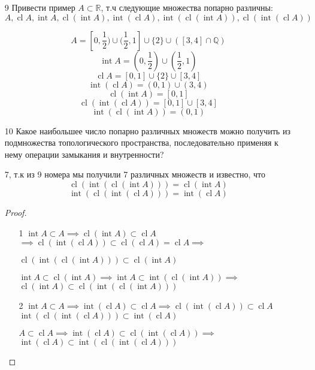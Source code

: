 \documentclass[a4paper, 12pt]{article}
\theoremstyle{definition}
\theoremstyle{remark}
\DeclareMathOperator{\Int}{int}
\DeclareMathOperator{\clo}{cl}
\begin{document}
\begin{enumerate}
    \item[9] Привести пример $A\subset \mathbb{R}$, т.ч следующие множества
    попарно различны:
    \[A, \clo A, \Int A, \clo (\Int A), \Int (\clo A), \Int (\clo (\Int A)), \clo(\Int (\clo A))\]

    \[A = [0, \frac12) \cup (\frac12, 1] \cup \{ 2\} \cup ([3, 4] \cap \mathbb{Q})\]
    \[\Int A = (0, \frac12) \cup (\frac12, 1)\]
    \[\clo A = [0,1] \cup \{2\} \cup [3, 4]\]
    \[\Int (\clo A) = (0, 1) \cup (3, 4)\]
    \[\clo (\Int A) = [0, 1]\]
    \[\clo (\Int (\clo A)) = [0,1] \cup [3, 4]\]
    \[\Int(\clo(\Int A)) = (0, 1)\]
    \item[10]
    Какое наибольшее число попарно различных множеств можно получить
    из подмножества топологического пространства, последовательно
    применяя к нему операции замыкания и внутренности?

    7, т.к из 9 номера мы получили 7 различных множеств
    и известно, что 
    \begin{equation}
        \clo (\Int (\clo (\Int A)))= \clo (\Int A)
    \end{equation}
    \begin{equation}
        \Int (\clo (\Int (\clo A)))= \Int (\clo A)
    \end{equation}
    \begin{proof}
        \begin{enumerate}
            \item[1] $\Int A \subset A \implies \clo (\Int A)\subset \clo A$
            $\implies \clo(\Int(\clo A))\subset \clo (\clo A) = \clo A\implies$

            $\clo (\Int (\clo (\Int A))) \subset \clo (\Int A)$

            $\Int A \subset \clo (\Int A) \implies \Int A \subset \Int (\clo (\Int A)) \implies$
            $\clo (\Int A) \subset \clo (\Int (\clo (\Int A)))$

            \item[2]  $\Int A \subset A \implies \Int (\clo A) \subset \clo A \implies \clo(\Int(\clo A)) \subset \clo A$
            $\Int(\clo (\Int (\clo A)))\subset \Int(\clo A)$

            $A\subset \clo A \implies \Int (\clo A) \subset \clo (\Int (\clo A)) \implies$
            $\Int (\clo A) \subset \Int (\clo (\Int (\clo A)))$
        \end{enumerate}
    \end{proof}

\end{enumerate}
\end{document}
